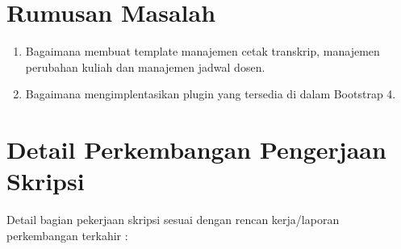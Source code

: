 \documentclass[a4paper,twoside]{article}
\begin{document}
	\section{Rumusan Masalah}
	\begin{enumerate}
		\item Bagaimana membuat template manajemen cetak transkrip, manajemen perubahan kuliah dan manajemen jadwal dosen.
		\item Bagaimana mengimplentasikan plugin yang tersedia di dalam Bootstrap 4.	
	\end{enumerate}
	
	\section{Detail Perkembangan Pengerjaan Skripsi}
	Detail bagian pekerjaan skripsi sesuai dengan rencan kerja/laporan perkembangan terkahir :
\end{document}
